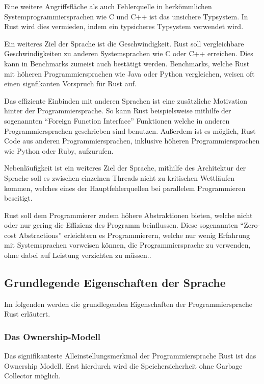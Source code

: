 Eine weitere Angriffsfläche als auch Fehlerquelle in herkömmlichen Systemprogrammiersprachen wie C und C++
ist das unsichere Typsystem. In Rust wird dies vermieden, indem ein typsicheres Typsystem verwendet wird.

Ein weiteres Ziel der Sprache ist die Geschwindigkeit. Rust soll vergleichbare Geschwindigkeiten zu anderen Systemsprachen wie
C oder C++ erreichen. Dies kann in Benchmarks zumeist auch bestätigt werden\cite{rustVsCBenchmark}. Benchmarks, welche Rust mit
höheren Programmiersprachen wie Java\cite{rustVsJavaBenchmark} oder Python\cite{rustVsPythonBenchmark} vergleichen,
weisen oft einen signfikanten Vorspruch für Rust auf.

Das effiziente Einbinden mit anderen Sprachen ist eine zusätzliche Motivation hinter der Programmiersprache.
So kann Rust beispielsweise mithilfe der sogenannten ``Foreign Function Interface''
Funktionen welche in anderen Programmiersprachen geschrieben sind benutzen. Außerdem ist es möglich,
Rust Code aus anderen Programmiersprachen, inklusive höheren Programmiersprachen wie Python oder Ruby, aufzurufen.

Nebenläufigkeit ist ein weiteres Ziel der Sprache, mithilfe des Architektur der Sprache soll es zwischen einzelnen Threads
nicht zu kritischen Wettläufen kommen, welches eines der Hauptfehlerquellen bei parallelem Programmieren beseitigt.

Rust soll dem Programmierer zudem höhere Abstraktionen bieten, welche nicht oder nur gering die Effizienz des Programm
beinflussen. Diese sogenannten ``Zero-cost Abstractions'' erleichtern es Programmierern, welche nur wenig Erfahrung mit
Systemsprachen vorweisen können, die Programmiersprache zu verwenden, ohne dabei auf Leistung verzichten zu müssen..

\subsection{Grundlegende Eigenschaften der Sprache}

Im folgenden werden die grundlegenden Eigenschaften der Programmiersprache Rust erläutert.

\subsubsection{Das Ownership-Modell}

Das signifikanteste Alleinstellungsmerkmal der Programmiersprache Rust ist das Ownership Modell. Erst hierdurch wird die
Speichersicherheit ohne Garbage Collector möglich.

